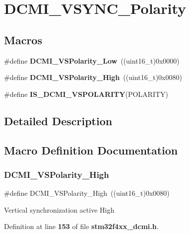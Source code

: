 \section{D\+C\+M\+I\+\_\+\+V\+S\+Y\+N\+C\+\_\+\+Polarity}
\label{group__DCMI__VSYNC__Polarity}
\subsection*{Macros}
\begin{DoxyCompactItemize}
\item 
\#define \textbf{ D\+C\+M\+I\+\_\+\+V\+S\+Polarity\+\_\+\+Low}~((uint16\+\_\+t)0x0000)
\item 
\#define \textbf{ D\+C\+M\+I\+\_\+\+V\+S\+Polarity\+\_\+\+High}~((uint16\+\_\+t)0x0080)
\item 
\#define \textbf{ I\+S\+\_\+\+D\+C\+M\+I\+\_\+\+V\+S\+P\+O\+L\+A\+R\+I\+TY}(P\+O\+L\+A\+R\+I\+TY)
\end{DoxyCompactItemize}


\subsection{Detailed Description}


\subsection{Macro Definition Documentation}
\mbox{\label{group__DCMI__VSYNC__Polarity_ga8ee9a81f7d657b0121ddff9ce0ae9bec}} 
\subsubsection{D\+C\+M\+I\+\_\+\+V\+S\+Polarity\+\_\+\+High}
{\footnotesize\ttfamily \#define D\+C\+M\+I\+\_\+\+V\+S\+Polarity\+\_\+\+High~((uint16\+\_\+t)0x0080)}

Vertical synchronization active High 

Definition at line \textbf{ 153} of file \textbf{ stm32f4xx\+\_\+dcmi.\+h}.

